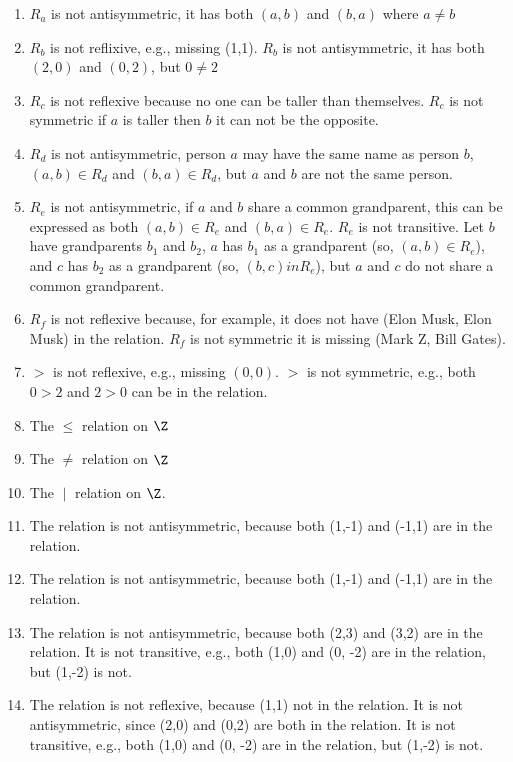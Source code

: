 \begin{questions}
\begin{solution}
\begin{enumerate}[label=(\alph*),itemsep=0pt,parsep=0pt,topsep=0pt,partopsep=0pt]
	\item $R_a$ is not antisymmetric, it has both $(a,b)$ and $(b,a)$ where $a \neq b$
	\item $R_b$ is not reflixive, e.g., missing (1,1). $R_b$ is not antisymmetric, it has both $(2,0)$ and $(0,2)$, but $0 \neq 2$
	\item $R_c$ is not reflexive because no one can be taller than themselves.  $R_c$ is not symmetric if $a$ is taller then $b$ it can not be the opposite.
	\item $R_d$ is not antisymmetric, person $a$ may have the same name as person $b$, $(a, b) \in R_d$ and $(b,a) \in R_d$, but $a$ and $b$ are not the same person.  
	\item $R_e$ is not antisymmetric, if $a$ and $b$ share a common grandparent, this can be expressed as both $(a,b) \in R_e$ and $(b,a) \in R_e$.  $R_e$ is not transitive.  Let $b$ have grandparents $b_1$ and $b_2$, $a$ has $b_1$ as a grandparent (so, $(a,b) \in R_e$), and $c$ has $b_2$ as a grandparent (so, $(b,c) in R_e$), but $a$ and $c$ do not share a common grandparent.
	\item $R_f$ is not reflexive because, for example, it does not have (Elon Musk, Elon Musk) in the relation.  $R_f$ is not symmetric it is missing (Mark Z, Bill Gates). 
	\item $>$ is not reflexive, e.g., missing $(0,0)$.  $>$ is not symmetric, e.g., both $0 > 2$ and $2 > 0$ can be in the relation. 
	\item The $\leq$ relation on $\Z$ 
	\item The $\neq$ relation on $\Z$ 
	\item The $\;|\;$ relation on $\Z$. 
	\item The relation is not antisymmetric, because both (1,-1) and (-1,1) are in the relation. 
	\item The relation is not antisymmetric, because both (1,-1) and (-1,1) are in the relation.
	\item The relation is not antisymmetric, because both (2,3) and (3,2) are in the relation.  It is not transitive, e.g., both (1,0) and (0, -2) are in the relation, but (1,-2) is not. 
	\item The relation is not reflexive, because (1,1) not in the relation.  It is not antisymmetric, since (2,0) and (0,2) are both in the relation.  It is not transitive, e.g., both (1,0) and (0, -2) are in the relation, but (1,-2) is not. 
\end{enumerate}



\end{solution}
\end{questions}
